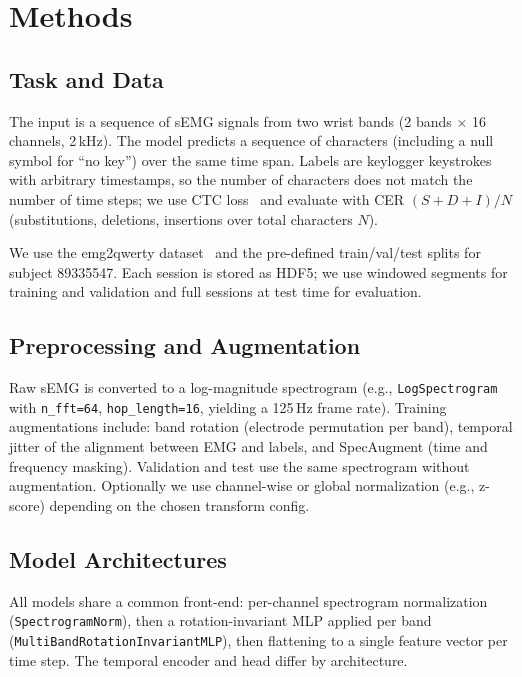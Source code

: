 \documentclass{article}
\begin{document}
\section{Methods}
\label{sec:methods}

\subsection{Task and Data}
The input is a sequence of sEMG signals from two wrist bands (2 bands $\times$ 16 channels, 2\,kHz). The model predicts a sequence of characters (including a null symbol for ``no key'') over the same time span. Labels are keylogger keystrokes with arbitrary timestamps, so the number of characters does not match the number of time steps; we use CTC loss~\cite{ctc} and evaluate with CER $(S + D + I)/N$ (substitutions, deletions, insertions over total characters $N$).

We use the emg2qwerty dataset~\cite{emg2qwerty} and the pre-defined train/val/test splits for subject 89335547. Each session is stored as HDF5; we use windowed segments for training and validation and full sessions at test time for evaluation.

\subsection{Preprocessing and Augmentation}
Raw sEMG is converted to a log-magnitude spectrogram (e.g., \texttt{LogSpectrogram} with \texttt{n\_fft=64}, \texttt{hop\_length=16}, yielding a 125\,Hz frame rate). Training augmentations include: band rotation (electrode permutation per band), temporal jitter of the alignment between EMG and labels, and SpecAugment (time and frequency masking). Validation and test use the same spectrogram without augmentation. Optionally we use channel-wise or global normalization (e.g., z-score) depending on the chosen transform config.

\subsection{Model Architectures}
All models share a common front-end: per-channel spectrogram normalization (\texttt{SpectrogramNorm}), then a rotation-invariant MLP applied per band (\texttt{MultiBandRotationInvariantMLP}), then flattening to a single feature vector per time step. The temporal encoder and head differ by architecture.
\end{document}
